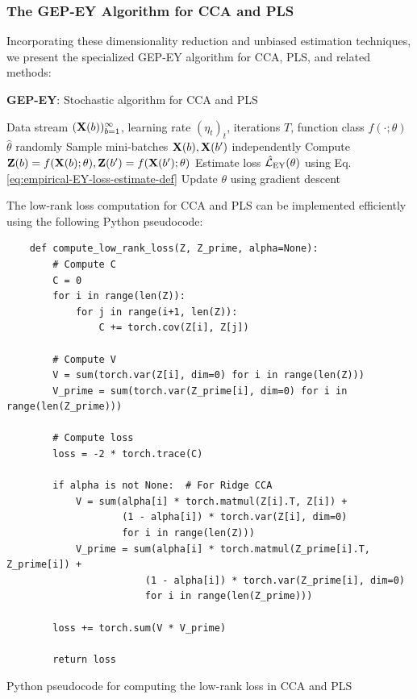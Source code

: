 \subsubsection{The GEP-EY Algorithm for CCA and PLS}
Incorporating these dimensionality reduction and unbiased estimation techniques, we present the specialized GEP-EY algorithm for CCA, PLS, and related methods:

\begin{algorithm}
\caption{\textbf{GEP-EY}: Stochastic algorithm for CCA and PLS}
\label{alg:cca_pls}
\begin{algorithmic}
 Data stream $(\mathbf{X}(b))_{b=1}^\infty$, learning rate $(\eta_t)_t$, iterations $T$, function class $f(\cdot; \theta)$
 $\hat{\theta}$ randomly
\STATE Sample mini-batches $\mathbf{X}(b), \mathbf{X}(b')$ independently
\STATE Compute $\mathbf{Z}(b) = f(\mathbf{X}(b); \theta), \mathbf{Z}(b') = f(\mathbf{X}(b'); \theta)$
\STATE Estimate loss $\hat{\mathcal{L}}_\text{EY}(\theta)$ using Eq. \eqref{eq:empirical-EY-loss-estimate-def}
\STATE Update $\theta$ using gradient descent
\ENDFOR
\end{algorithmic}
\end{algorithm}

The low-rank loss computation for CCA and PLS can be implemented efficiently using the following Python pseudocode:

\begin{listing}[ht]
    \begin{verbatim}
    def compute_low_rank_loss(Z, Z_prime, alpha=None):
        # Compute C
        C = 0
        for i in range(len(Z)):
            for j in range(i+1, len(Z)):
                C += torch.cov(Z[i], Z[j])
        
        # Compute V
        V = sum(torch.var(Z[i], dim=0) for i in range(len(Z)))
        V_prime = sum(torch.var(Z_prime[i], dim=0) for i in range(len(Z_prime)))
        
        # Compute loss
        loss = -2 * torch.trace(C)
        
        if alpha is not None:  # For Ridge CCA
            V = sum(alpha[i] * torch.matmul(Z[i].T, Z[i]) + 
                    (1 - alpha[i]) * torch.var(Z[i], dim=0) 
                    for i in range(len(Z)))
            V_prime = sum(alpha[i] * torch.matmul(Z_prime[i].T, Z_prime[i]) + 
                        (1 - alpha[i]) * torch.var(Z_prime[i], dim=0) 
                        for i in range(len(Z_prime)))
        
        loss += torch.sum(V * V_prime)
        
        return loss
    \end{verbatim}
    \caption{Python pseudocode for computing the low-rank loss in CCA and PLS}
    \label{lst:low-rank-loss}
\end{listing}

